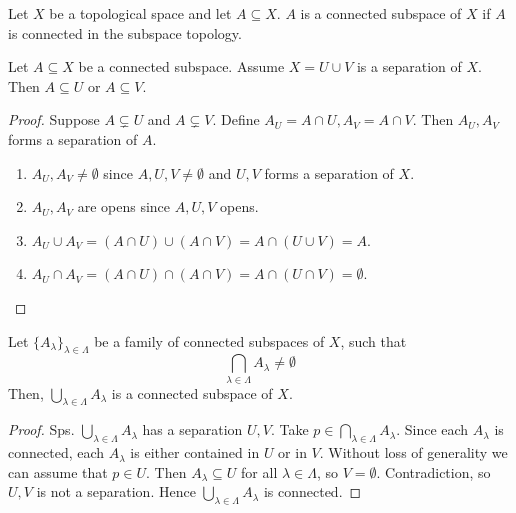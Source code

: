 \begin{definition}
   Let \( X \) be a topological space and let \( A \subseteq X \).
   \( A \) is a connected subspace of \( X \) if \( A \) is connected in
   the subspace topology.
\end{definition}

\begin{lemma}
    Let \( A \subseteq X \) be a connected subspace.
    Assume \( X = U \cup V \) is a separation of \( X \).
    Then \( A \subseteq U \) or \( A \subseteq V \).
\end{lemma}

\begin{proof}
   Suppose \( A \subsetneq U \) and \( A \subsetneq V \).
   Define \( A_U = A \cap U, A_V = A \cap V \).
   Then \( A_U, A_V \) forms a separation of \( A \).
   \begin{enumerate}
     \item \( A_U, A_V \neq \emptyset \) since \( A, U, V \neq \emptyset \)
        and \( U, V \) forms a separation of \( X \).
     \item \( A_U, A_V \) are opens since \( A, U, V \) opens.
     \item \( A_U \cup A_V = (A \cap U) \cup (A \cap V) = A \cap (U \cup V) = A  \).
     \item \( A_U \cap A_V = (A \cap U) \cap (A \cap V) = A \cap (U \cap V) = \emptyset  \).
   \end{enumerate}
\end{proof}

\begin{lemma}
  Let \( \{ A_\lambda \}_{\lambda \in \Lambda}  \) be a family of
  connected subspaces of \( X \), such that
  \[
    \bigcap_{\lambda \in \Lambda} A_\lambda \neq \emptyset
  \]
  Then,
  \( \bigcup_{\lambda \in \Lambda} A_\lambda \)
  is a connected subspace of \( X \).
\end{lemma}

\begin{proof}
  Sps. \( \bigcup_{\lambda \in \Lambda} A_\lambda \) has a separation
  \( U, V \). Take \( p \in \bigcap_{\lambda \in \Lambda} A_\lambda \).
  Since each \( A_{\lambda} \) is connected,
  each \( A_\lambda \) is either contained in \( U \) 
  or in \( V \). Without loss of generality we can assume that
  \( p \in  U \).
  Then \( A_\lambda \subseteq U \) for all \( \lambda \in \Lambda \),
  so \( V = \emptyset \). Contradiction, so \( U, V \) is not a separation.
  Hence \( \bigcup_{\lambda \in \Lambda} A_\lambda \)
  is connected.
\end{proof}

